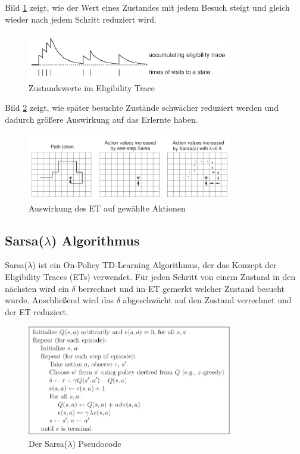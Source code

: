 \documentclass[10pt]{scrartcl}
\begin{document}
Bild \ref{fig:Trace} zeigt, wie der Wert eines Zustandes mit jedem Besuch steigt und gleich wieder nach jedem Schritt reduziert wird.
\begin{figure}[htbp]
	\centering	\includegraphics[width=0.8\textwidth]{Bilder/TraceDecay.png}
	\caption{Zustandswerte im Eligibility Trace}
	\label{fig:Trace}
\end{figure}
Bild \ref{fig:Trace1} zeigt, wie später besuchte Zustände schwächer reduziert werden und dadurch größere Auswirkung auf das Erlernte haben.
\begin{figure}[htbp]
	\centering	\includegraphics[width=0.8\textwidth]{Bilder/ETBild.jpg}
	\caption{Auswirkung des ET auf gewählte Aktionen}
	\label{fig:Trace1}
\end{figure}

\subsection{Sarsa($\lambda$) Algorithmus}
Sarsa($\lambda$) ist ein On-Policy TD-Learning Algorithmus, der das Konzept der Eligibility Traces (ETs) verwendet.
Für jeden Schritt von einem Zustand in den nächsten wird ein $\delta$ berrechnet und im ET gemerkt welcher Zustand besucht wurde. Anschließend wird das $\delta$ abgeschwächt auf den Zustand verrechnet und der ET reduziert.
\begin{figure}[htbp]
	\centering	\includegraphics[width=0.8\textwidth]{Bilder/SarsaLambda.jpg}
	\caption{Der Sarsa($\lambda$) Pseudocode}
	\label{fig:SarsaLambda}
\end{figure}
\end{document}
